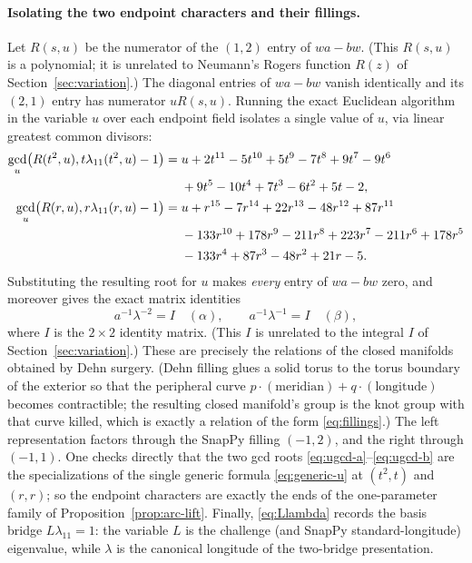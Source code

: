 \documentclass[11pt]{article}
\theoremstyle{definition}
\begin{document}
\paragraph{Isolating the two endpoint characters and their fillings.}
Let $R(s,u)$ be the numerator of the $(1,2)$ entry of $wa-bw$.  (This $R(s,u)$
is a polynomial; it is unrelated to Neumann's Rogers function $R(z)$ of
Section~\ref{sec:variation}.)  The diagonal entries of $wa-bw$ vanish
identically and its $(2,1)$ entry has numerator $uR(s,u)$.  Running the exact
Euclidean algorithm in the variable $u$ over each endpoint field isolates a
single value of $u$, via linear greatest common divisors:
\begin{align}
 \gcd_u\bigl(R(t^2,u),t\lambda_{11}(t^2,u)-1\bigr)
 ={}&u+2t^{11}-5t^{10}+5t^9-7t^8+9t^7-9t^6\notag\\
 &{}+9t^5-10t^4+7t^3-6t^2+5t-2,\label{eq:ugcd-a}\\
 \gcd_u\bigl(R(r,u),r\lambda_{11}(r,u)-1\bigr)
 ={}&u+r^{15}-7r^{14}+22r^{13}-48r^{12}+87r^{11}\notag\\
 &{}-133r^{10}+178r^9-211r^8+223r^7-211r^6
 +178r^5\notag\\
 &{}-133r^4+87r^3-48r^2+21r-5.\label{eq:ugcd-b}
\end{align}
Substituting the resulting root for $u$ makes \emph{every} entry of $wa-bw$
zero, and moreover gives the exact matrix identities
\begin{equation}\label{eq:fillings}
 a^{-1}\lambda^{-2}=I\quad(\alpha),
 \qquad
 a^{-1}\lambda^{-1}=I\quad(\beta),
\end{equation}
where $I$ is the $2\times2$ identity matrix.  (This $I$ is unrelated to the
integral $I$ of Section~\ref{sec:variation}.)  These are precisely the relations
of the closed manifolds obtained by Dehn surgery.  (Dehn filling glues a solid
torus to the torus boundary of the exterior so that the peripheral curve
$p\cdot(\text{meridian})+q\cdot(\text{longitude})$ becomes contractible; the
resulting closed manifold's group is the knot group with that curve killed,
which is exactly a relation of the form \eqref{eq:fillings}.)  The left
representation
factors through the SnapPy filling $(-1,2)$, and the right through $(-1,1)$.  One
checks directly that the two gcd roots \eqref{eq:ugcd-a}--\eqref{eq:ugcd-b} are
the specializations of the single generic formula \eqref{eq:generic-u} at
$(t^2,t)$ and $(r,r)$; so the endpoint characters are exactly the ends of the
one-parameter family of Proposition~\ref{prop:arc-lift}.  Finally,
\eqref{eq:Llambda} records the basis bridge $L\lambda_{11}=1$: the variable $L$
is the challenge (and SnapPy standard-longitude) eigenvalue, while $\lambda$ is
the canonical longitude of the two-bridge presentation.
\end{document}
